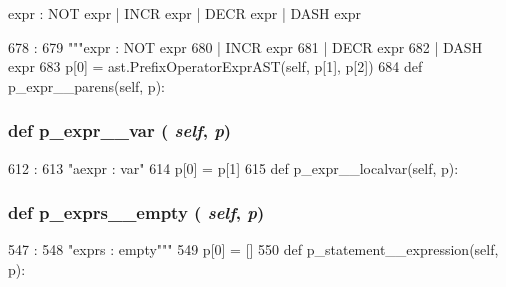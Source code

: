 \begin{DoxyVerb}expr : NOT expr
| INCR expr
| DECR expr
| DASH expr %
 


\begin{DoxyCode}
678                                  :
679         """expr : NOT expr
680                 | INCR expr
681                 | DECR expr
682                 | DASH expr %
683         p[0] = ast.PrefixOperatorExprAST(self, p[1], p[2])
684 
    def p_expr__parens(self, p):
\end{DoxyCode}
\hypertarget{classslicc_1_1parser_1_1SLICC_a9161ad18c5b00a1568d3434079fc118c}{
\subsubsection[{p\_\-expr\_\-\_\-var}]{\setlength{\rightskip}{0pt plus 5cm}def p\_\-expr\_\-\_\-var ( {\em self}, \/   {\em p})}}
\label{classslicc_1_1parser_1_1SLICC_a9161ad18c5b00a1568d3434079fc118c}



\begin{DoxyCode}
612                             :
613         "aexpr : var"
614         p[0] = p[1]
615 
    def p_expr__localvar(self, p):
\end{DoxyCode}
\hypertarget{classslicc_1_1parser_1_1SLICC_af484cfb1cda74b81011444d62fd07873}{
\subsubsection[{p\_\-exprs\_\-\_\-empty}]{\setlength{\rightskip}{0pt plus 5cm}def p\_\-exprs\_\-\_\-empty ( {\em self}, \/   {\em p})}}
\label{classslicc_1_1parser_1_1SLICC_af484cfb1cda74b81011444d62fd07873}



\begin{DoxyCode}
547                                :
548         "exprs : empty"""
549         p[0] = []
550 
    def p_statement__expression(self, p):
\end{DoxyCode}
\hypertarget{classslicc_1_1parser_1_1SLICC_aca3f4f9507d6ed2ece13aaaaec53253d}{
}
\end{DoxyVerb}
